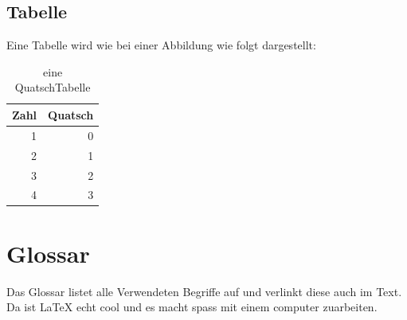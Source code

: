 \subsection{Tabelle}
Eine Tabelle wird wie bei einer Abbildung wie folgt dargestellt: \\

\begin{table}[hb] \centering
\begin{tabular}{|r|r|}
\hline
Zahl & Quatsch \\
\hline
1  &  0  \\
\hline
2  &  1  \\
\hline
3  &  2  \\
\hline
4  &  3  \\
\hline

\end{tabular}

\caption{eine QuatschTabelle}
\label{tabquatsch}
\end{table}



\section{Glossar}
Das Glossar listet alle Verwendeten Begriffe auf und verlinkt diese auch im Text. Da ist \gls{LaTeX} echt cool und es macht spass mit einem \gls{computer} zuarbeiten.



